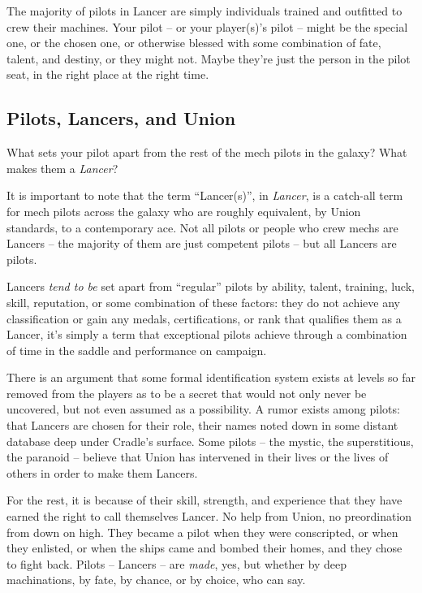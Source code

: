 The majority of pilots in Lancer are simply individuals trained and outfitted to crew their
machines. Your pilot -- or your player(s)’s pilot -- might be the special one, or the chosen one, or
otherwise blessed with some combination of fate, talent, and destiny, or they might not. Maybe
they’re just the person in the pilot seat, in the right place at the right time.

\subsection{Pilots, Lancers, and Union}

What sets your pilot apart from the rest of the mech pilots in the galaxy? What makes them a
\textit{Lancer}?

It is important to note that the term “Lancer(s)”, in \textit{Lancer}, is a catch-all term for mech pilots
across the galaxy who are roughly equivalent, by Union standards, to a contemporary ace. Not all
pilots or people who crew mechs are Lancers -- the majority of them are just competent pilots --
but all Lancers are pilots.

Lancers \textit{tend to be} set apart from “regular” pilots by ability, talent, training, luck, skill, reputation, or
some combination of these factors: they do not achieve any classification or gain any medals,
certifications, or rank that qualifies them as a Lancer, it’s simply a term that exceptional pilots
achieve through a combination of time in the saddle and performance on campaign.

There is an argument that some formal identification system exists at levels so far removed from
the players as to be a secret that would not only never be uncovered, but not even assumed as a
possibility. A rumor exists among pilots: that Lancers are chosen for their role, their names noted
down in some distant database deep under Cradle’s surface. Some pilots -- the mystic, the
superstitious, the paranoid -- believe that Union has intervened in their lives or the lives of others
in order to make them Lancers.

For the rest, it is because of their skill, strength, and experience that they have earned the right to
call themselves Lancer. No help from Union, no preordination from down on high. They became a
pilot when they were conscripted, or when they enlisted, or when the ships came and bombed
their homes, and they chose to fight back. Pilots -- Lancers -- are \textit{made}, yes, but whether by deep
machinations, by fate, by chance, or by choice, who can say.

